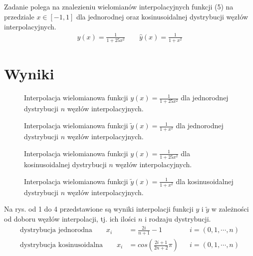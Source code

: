 \documentclass[11pt]{extarticle}
\begin{document}
	\subsection{}
	Zadanie polega na znalezieniu wielomianów interpolacyjnych funkcji (5) na przedziale \(x\in[-1, 1]\) dla jednorodnej oraz kosinusoidalnej dystrybucji węzłów interpolacyjnych.
	\begin{align}
		y(x) = \frac{1}{1+25x^2} \qquad \widehat{y}(x) = \frac{1}{1+x^2}
	\end{align}

	\clearpage
	\section{Wyniki}
	\begin{figure}[H]
		\begin{center}
			
		\end{center}
		\caption{Interpolacja wielomianowa funkcji \( y(x)=\frac{1}{1+25x^2} \) dla jednorodnej dystrybucji \(n\) węzłów interpolacyjnych.}
		\label{f1u}
	\end{figure}
	\begin{figure}[H]
		\begin{center}
			
		\end{center}
		\caption{Interpolacja wielomianowa funkcji \( \widetilde{y}(x)=\frac{1}{1+x^2} \) dla jednorodnej dystrybucji \(n\) węzłów interpolacyjnych.}
		\label{f2u}
	\end{figure}
	\begin{figure}[H]
		\begin{center}
			
		\end{center}
		\caption{Interpolacja wielomianowa funkcji \( y(x)=\frac{1}{1+25x^2} \) dla kosinusoidalnej dystrybucji \(n\) węzłów interpolacyjnych.}
		\label{f1c}
	\end{figure}
	\begin{figure}[H]
		\begin{center}
			
		\end{center}
		\caption{Interpolacja wielomianowa funkcji \( \widetilde{y}(x)=\frac{1}{1+x^2} \) dla kosinusoidalnej dystrybucji \(n\) węzłów interpolacyjnych.}
		\label{f2c}
	\end{figure}
	\clearpage

	Na rys. od 1 do 4 przedstawione są wyniki interpolacji funkcji \(y\) i \(\widetilde{y}\) w zależności od doboru węzłów interpolacji, tj. ich ilości \(n\) i rodzaju dystrybucji.
	\begin{align}
		\text{dystrybucja jednorodna} \qquad
		x_i &= \frac{2i}{n+1}-1 &&i=(0, 1, \dotsm, n) \\
		\text{dystrybucja kosinusoidalna} \qquad
		x_i &= cos\left(\frac{2i+1}{2n+2}\pi\right) &&i=(0, 1, \dotsm, n)
	\end{align}
\end{document}

